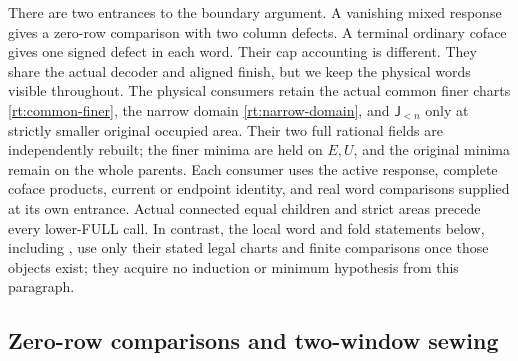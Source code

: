 \documentclass[11pt,a4paper]{amsart}
\numberwithin{equation}{section}
\theoremstyle{plain}
\theoremstyle{definition}
\newcommand{\Jlower}{\mathsf J_{<n}}
\begin{document}
There are two entrances to the boundary argument.  A vanishing mixed
response gives a zero-row comparison with two column defects.  A terminal
ordinary coface gives one signed defect in each word.  Their cap accounting
is different.  They share the actual decoder and aligned finish, but we
keep the physical words visible throughout.
The physical consumers
retain the actual common finer charts \eqref{rt:common-finer}, the
narrow domain \eqref{rt:narrow-domain}, and \(\Jlower\) only at
strictly smaller original occupied area.  Their two full rational
fields are independently rebuilt; the finer minima are held on
\(E,U\), and the original minima remain on the whole parents.
Each consumer uses the active response, complete coface products,
current or endpoint identity, and real word comparisons supplied at
its own entrance.  Actual connected equal children and strict areas
precede every lower-FULL call.  In contrast, the local word and
fold statements below, including
, use only their stated
legal charts and finite comparisons once those objects exist;
they acquire no induction or minimum hypothesis from this paragraph.


\subsection{Zero-row comparisons and two-window sewing}
\end{document}
